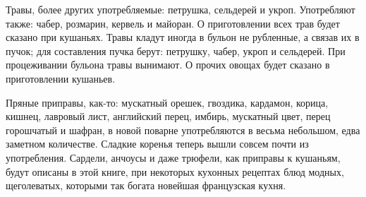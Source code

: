 Травы, более других употребляемые: петрушка, сельдерей и укроп. Употребляют также: чабер, розмарин, кервель и майоран. О приготовлении всех трав будет сказано при кушаньях. Травы кладут иногда в бульон не рубленные, а связав их в пучок; для составления пучка берут: петрушку, чабер, укроп и сельдерей. При процеживании бульона травы вынимают. О прочих овощах будет сказано в приготовлении кушаньев.

Пряные приправы, как-то: мускатный орешек, гвоздика, кардамон, корица, кишнец, лавровый лист, английский перец, имбирь, мускатный цвет, перец горошчатый и шафран, в новой поварне употребляются в весьма небольшом, едва заметном количестве. Сладкие коренья теперь вышли совсем почти из употребления. Сардели, анчоусы и даже трюфели, как приправы к кушаньям, будут описаны в этой книге, при некоторых кухонных рецептах блюд модных, щеголеватых, которыми так богата новейшая французская кухня.

